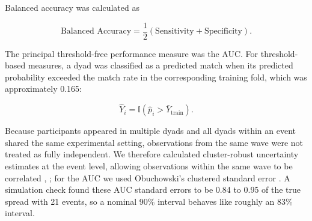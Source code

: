 Balanced accuracy was calculated as

\begin{equation}
\text{Balanced Accuracy}
=
\frac{1}{2}
\left(
\text{Sensitivity}
+
\text{Specificity}
\right).
\end{equation}

The principal threshold-free performance measure was the AUC. For threshold-based measures, a dyad was classified as a predicted match when its predicted probability exceeded the match rate in the corresponding training fold, which was approximately 0.165:

\begin{equation}
\widehat{Y}_i
=
\mathbb{I}
\left(
\widehat{p}_i
>
\bar{Y}_{\mathrm{train}}
\right).
\end{equation}

Because participants appeared in multiple dyads and all dyads within an event shared the same experimental setting, observations from the same wave were not treated as fully independent. We therefore calculated cluster-robust uncertainty estimates at the event level, allowing observations within the same wave to be correlated \cite{Liang:1986}, \cite[Section II.C]{Cameron:2015}; for the AUC we used Obuchowski's clustered standard error \cite{Obuchowski:1997}. A simulation check found these AUC standard errors to be 0.84 to 0.95 of the true spread with 21 events, so a nominal 90\% interval behaves like roughly an 83\% interval.
